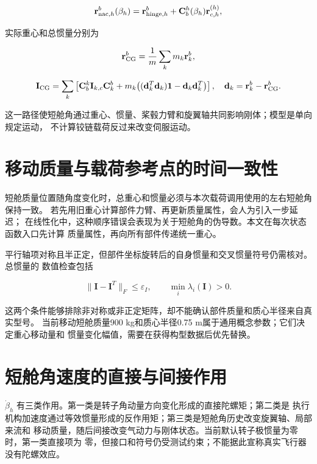 \documentclass[UTF8,12pt,oneside,openany,fontset=windows]{ctexbook}
\begin{document}
\begin{equation}
\mathbf r_{{\rm nac},h}^b(\beta_h)=
\mathbf r_{{\rm hinge},h}^b+\mathbf C_b^h(\beta_h)\mathbf r_{c,h}^{(h)},
\end{equation}

实际重心和总惯量分别为

\begin{equation}
\mathbf r_{\rm CG}^b=\frac{1}{m}\sum_km_k\mathbf r_k^b,
\end{equation}

\begin{equation}
\mathbf I_{\rm CG}=\sum_k\left[
\mathbf C_b^k\mathbf I_{k,c}\mathbf C_k^b
+m_k\big((\mathbf d_k^T\mathbf d_k)\mathbf 1-\mathbf d_k\mathbf d_k^T\big)
\right],
\quad \mathbf d_k=\mathbf r_k^b-\mathbf r_{\rm CG}^b.
\end{equation}

这一路径使短舱角通过重心、惯量、桨毂力臂和旋翼轴共同影响刚体；模型是单向规定运动， 不计算铰链载荷反过来改变伺服运动。

\section{移动质量与载荷参考点的时间一致性}

短舱质量位置随角度变化时，总重心和惯量必须与本次载荷调用使用的左右短舱角保持一致。 若先用旧重心计算部件力臂、再更新质量属性，会人为引入一步延迟； 在线性化中，这种顺序错误会表现为关于短舱角的伪导数。本文在每次状态函数入口先计算 质量属性，再向所有部件传递统一重心。

平行轴项对称且半正定，但部件坐标旋转后的自身惯量和交叉惯量符号仍需核对。总惯量的 数值检查包括

\begin{equation}
\|\mathbf I-\mathbf I^T\|_F\le\varepsilon_I,\qquad
\min_i\lambda_i(\mathbf I)>0.
\end{equation}

这两个条件能够排除非对称或非正定矩阵，却不能确认部件质量和质心半径来自真实型号。 当前移动短舱质量900 kg和质心半径0.75 m属于通用概念参数；它们决定重心移动量和 惯量变化幅值，需要在获得构型数据后优先替换。

\section{短舱角速度的直接与间接作用}

\(\dot\beta_h\) 有三类作用。第一类是转子角动量方向变化形成的直接陀螺矩；第二类是 执行机构加速度通过等效惯量形成的反作用矩；第三类是短舱角历史改变旋翼轴、局部来流和 移动质量，随后间接改变气动力与刚体状态。当前默认转子极惯量为零时，第一类直接项为 零，但接口和符号仍受测试约束；不能据此宣称真实飞行器没有陀螺效应。
\end{document}

